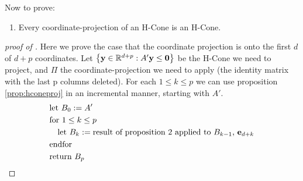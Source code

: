 Now to prove:
\begin{enumerate}
	\item[\Vproj] Every coordinate-projection of an H-Cone is an H-Cone.
\end{enumerate}

\begin{proof}[proof of \Vproj]
	Here we prove the case that the coordinate projection is onto the first $d$ of $d+p$ coordinates.  Let $\left\{\mathbf{y}\in\mathbb{R}^{d+p}:A'\mathbf{y} \leq \mathbf{0}\right\}$ be the H-Cone we need to project, and $\Pi$ the coordinate-projection we need to apply (the identity matrix with the last p columns deleted).  For each $1 \leq k \leq p$ we can use proposition \ref{prop:hconeproj} in an incremental manner, starting with $A'$.
	\begin{align*}
		 & \text{let } B_0 := A'                                        \\
		 & \text{for } 1 \leq k \leq p                                  \\
		 & \quad \text{let } B_k :=
		\text{result of proposition 2 applied to $B_{k-1}$, $\mathbf{e}_{d+k}$} \\
		 & \text{endfor}                                                \\
		 & \text{return } B_p
	\end{align*}



\end{proof}

